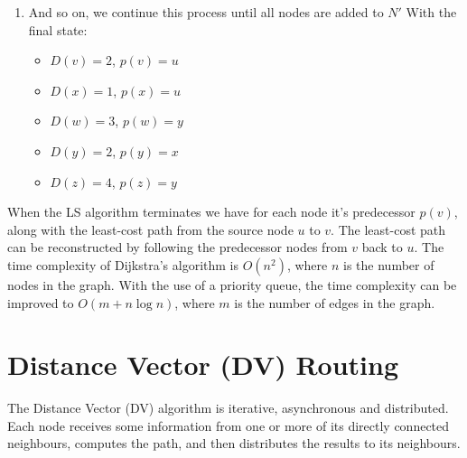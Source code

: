 \documentclass[12pt letter]{report}
\begin{document}
{\begin{enumerate}
      New state:
      \begin{itemize}
        \item $D(v) = 2$, $p(v) = u$
        \item $D(x) = 1$, $p(x) = u$
        \item $D(w) = 3$, $p(w) = y$
        \item $D(y) = 2$, $p(y) = x$
        \item $D(z) = 4$, $p(z) = y$
      \end{itemize}
    \item And so on, we continue this process until all nodes are added to $N'$
      With the final state:
      \begin{itemize}
        \item $D(v) = 2$, $p(v) = u$
        \item $D(x) = 1$, $p(x) = u$
        \item $D(w) = 3$, $p(w) = y$
        \item $D(y) = 2$, $p(y) = x$
        \item $D(z) = 4$, $p(z) = y$
      \end{itemize}
  \end{enumerate}
}

When the LS algorithm terminates we have for each node it's
predecessor $p \left( v \right) $, along with the least-cost path
from the source node $u$ to $v$. The least-cost path can be
reconstructed by following the predecessor nodes from $v$ back to
$u$. The time complexity of Dijkstra's algorithm is $O \left( n^2
\right) $, where $n$ is the number of nodes in the graph. With the
use of a priority queue, the time complexity can be improved to $O
\left( m + n \log n \right) $, where $m$ is the number of edges in the graph.

\section{Distance Vector (DV) Routing}

The Distance Vector (DV) algorithm is iterative, asynchronous and
distributed. Each node receives some information from one or more of
its directly connected neighbours, computes the path, and then
distributes the results to its neighbours.
\end{document}
